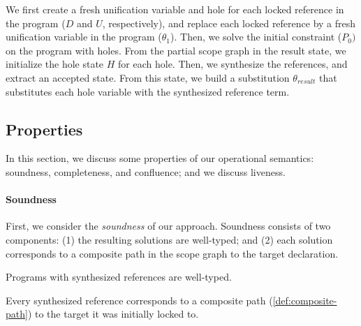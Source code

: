 \noindent
We first create a fresh unification variable and hole for each locked reference in the program ($D$ and $U$, respectively),
and replace each locked reference by a fresh unification variable in the program ($\theta_1$).
Then, we solve the initial constraint ($P_0)$ on the program with holes.
From the partial scope graph in the result state, we initialize the hole state $H$ for each hole.
Then, we synthesize the references, and extract an accepted state.
From this state, we build a substitution $\theta_{result}$ that substitutes each hole variable with the synthesized reference term.

\pagebreak[4]  %

\subsection{Properties}%
\label{subsec:operational-semantics-discussion}

In this section, we discuss some properties of our operational semantics: soundness, completeness, and confluence; and we discuss liveness.

\paragraph{Soundness}
First, we consider the \emph{soundness} of our approach.
Soundness consists of two components:
(1) the resulting solutions are well-typed; and
(2) each solution corresponds to a composite path in the scope graph to the target declaration.
%
\begin{theorem}[Soundness 1]
  \label{thm:soundness-1}
  Programs with synthesized references are well-typed.
\end{theorem}
%
\begin{theorem}[Soundness 2]
  \label{thm:soundness-2}
  Every synthesized reference corresponds to a composite path (\cref{def:composite-path}) to the target it was initially locked to.
\end{theorem}%
\iftoggle{extended}{%
  \Cref{thm:soundness-1,thm:soundness-2} have formal definitions and proofs in~\cref{subsec:well-typed-solutions,subsec:composite-paths}, respectively.
}{%
  Formal definitions and proofs of~\cref{thm:soundness-1,thm:soundness-2} can be found in the extended version of this paper~\cite{Pelsmaeker_OOPSLA25_Extended}, appendices A.2 and A.3, respectively.
}%

